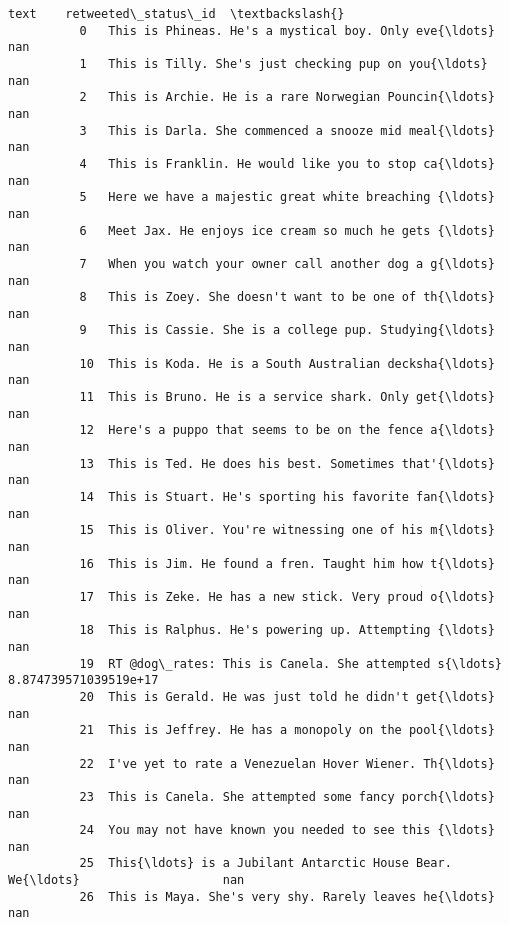 \documentclass[11pt]{article}
\begin{document}
\begin{Verbatim}[commandchars=\\\{\}]
                                                           text    retweeted\_status\_id  \textbackslash{}
          0   This is Phineas. He's a mystical boy. Only eve{\ldots}                    nan   
          1   This is Tilly. She's just checking pup on you{\ldots}                    nan   
          2   This is Archie. He is a rare Norwegian Pouncin{\ldots}                    nan   
          3   This is Darla. She commenced a snooze mid meal{\ldots}                    nan   
          4   This is Franklin. He would like you to stop ca{\ldots}                    nan   
          5   Here we have a majestic great white breaching {\ldots}                    nan   
          6   Meet Jax. He enjoys ice cream so much he gets {\ldots}                    nan   
          7   When you watch your owner call another dog a g{\ldots}                    nan   
          8   This is Zoey. She doesn't want to be one of th{\ldots}                    nan   
          9   This is Cassie. She is a college pup. Studying{\ldots}                    nan   
          10  This is Koda. He is a South Australian decksha{\ldots}                    nan   
          11  This is Bruno. He is a service shark. Only get{\ldots}                    nan   
          12  Here's a puppo that seems to be on the fence a{\ldots}                    nan   
          13  This is Ted. He does his best. Sometimes that'{\ldots}                    nan   
          14  This is Stuart. He's sporting his favorite fan{\ldots}                    nan   
          15  This is Oliver. You're witnessing one of his m{\ldots}                    nan   
          16  This is Jim. He found a fren. Taught him how t{\ldots}                    nan   
          17  This is Zeke. He has a new stick. Very proud o{\ldots}                    nan   
          18  This is Ralphus. He's powering up. Attempting {\ldots}                    nan   
          19  RT @dog\_rates: This is Canela. She attempted s{\ldots}  8.874739571039519e+17   
          20  This is Gerald. He was just told he didn't get{\ldots}                    nan   
          21  This is Jeffrey. He has a monopoly on the pool{\ldots}                    nan   
          22  I've yet to rate a Venezuelan Hover Wiener. Th{\ldots}                    nan   
          23  This is Canela. She attempted some fancy porch{\ldots}                    nan   
          24  You may not have known you needed to see this {\ldots}                    nan   
          25  This{\ldots} is a Jubilant Antarctic House Bear. We{\ldots}                    nan   
          26  This is Maya. She's very shy. Rarely leaves he{\ldots}                    nan   

\end{Verbatim}
\end{document}

